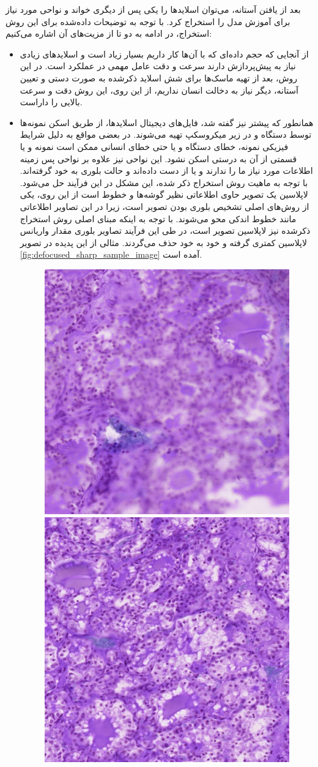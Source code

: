\begin{enumerate}
\begin{figure}
        \label{fig:threshold_train_slides_and_menuall_masks}
    \end{figure}
\end{enumerate}
بعد از یافتن آستانه، می‌توان اسلاید‌ها را یکی پس از دیگری خواند و نواحی مورد نیاز برای آموزش مدل را استخراج کرد.
با توجه به توضیحات داده‌شده برای این روش استخراج، در ادامه به دو تا از مزیت‌های آن اشاره می‌کنیم:
\begin{itemize}
    \item از آنجایی که حجم داده‌ای که با آن‌ها کار داریم بسیار زیاد است و اسلاید‌های زیادی نیاز به پیش‌پردازش دارند سرعت و دقت عامل مهمی در عملکرد است.
    در این روش، بعد از تهیه ماسک‌ها برای شش اسلاید ذکر‌شده به صورت دستی و تعیین آستانه، دیگر نیاز به دخالت انسان نداریم، از این روی، این روش دقت و سرعت بالایی را داراست.
    \item همانطور که پیشتر نیز گفته شد، فایل‌های دیجیتال اسلاید‌ها، از طریق اسکن نمونه‌ها توسط دستگاه و در زیر میکروسکپ تهیه می‌شوند.
    در بعضی مواقع به دلیل شرایط فیزیکی نمونه، خطای دستگاه و یا حتی خطای انسانی ممکن است نمونه و یا قسمتی از آن به درستی اسکن نشود.
    این نواحی نیز علاوه بر نواحی پس زمینه اطلاعات مورد نیاز ما را ندارند و یا از دست داده‌اند و حالت بلوری به خود گرفته‌اند.
    با توجه به ماهیت روش استخراج ذکر شده، این مشکل در این فرآیند حل می‌شود.
    لاپلاسین یک تصویر حاوی اطلاعاتی نظیر گوشه‌ها و خطوط است از این روی، یکی از روش‌های اصلی تشخیص بلوری بودن تصویر است، زیرا در این تصاویر اطلاعاتی مانند خطوط اندکی محو می‌شوند.
    با توجه به اینکه مبنای اصلی روش استخراج ذکر‌شده نیز لاپلاسین تصویر است، در طی این فرآیند تصاویر بلوری مقدار واریانس لاپلاسین کمتری گرفته و خود به خود حذف می‌گردند. مثالی از این پدیده در تصویر \ref{fig:defocused_sharp_sample_image} آمده است.
    \begin{figure}
    	\begin{center}
    		\includegraphics[width=0.48\linewidth]{figs/suggested_methods/subs/patcher/defocused.png}
    		\includegraphics[width=0.48\linewidth]{figs/suggested_methods/subs/patcher/sharp.png}

\end{center}
\end{figure}
\end{itemize}
